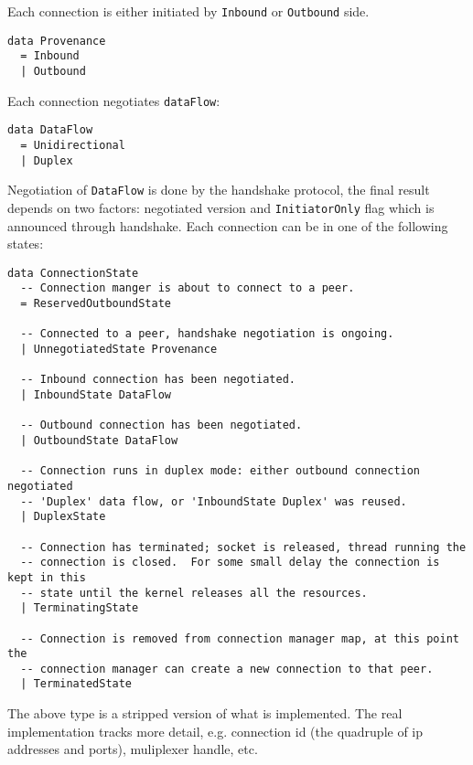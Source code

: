 \documentclass{article}
\begin{document}
Each connection is either initiated by \texttt{Inbound} or \texttt{Outbound} side.
\begin{lstlisting}
data Provenance
  = Inbound
  | Outbound
\end{lstlisting}
Each connection negotiates \texttt{dataFlow}:
\begin{lstlisting}
data DataFlow
  = Unidirectional
  | Duplex
\end{lstlisting}
Negotiation of \texttt{DataFlow} is done by the handshake protocol, the final
result depends on two factors: negotiated version and \texttt{InitiatorOnly}
flag which is announced through handshake.  Each connection can be in one
of the following states:
\begin{lstlisting}
data ConnectionState
  -- Connection manger is about to connect to a peer.
  = ReservedOutboundState

  -- Connected to a peer, handshake negotiation is ongoing.
  | UnnegotiatedState Provenance

  -- Inbound connection has been negotiated.
  | InboundState DataFlow

  -- Outbound connection has been negotiated.
  | OutboundState DataFlow

  -- Connection runs in duplex mode: either outbound connection negotiated
  -- 'Duplex' data flow, or 'InboundState Duplex' was reused.
  | DuplexState

  -- Connection has terminated; socket is released, thread running the
  -- connection is closed.  For some small delay the connection is kept in this
  -- state until the kernel releases all the resources.
  | TerminatingState

  -- Connection is removed from connection manager map, at this point the
  -- connection manager can create a new connection to that peer.
  | TerminatedState
\end{lstlisting}
The above type is a stripped version of what is implemented.  The real
implementation tracks more detail, e.g. connection id (the quadruple of ip
addresses and ports), muliplexer handle, etc.
\end{document}
